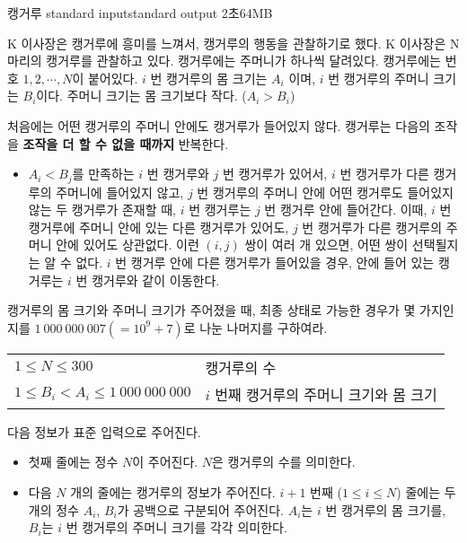 \begin{problem}{캥거루}
	{standard input}{standard output}
	{2초}{64MB}{}
	
	K 이사장은 캥거루에 흥미를 느껴서, 캥거루의 행동을 관찰하기로 했다. K 이사장은 N 마리의 캥거루를 관찰하고 있다. 캥거루에는 주머니가 하나씩 달려있다. 캥거루에는 번호 $1, 2, \cdots, N$이 붙어있다. $i$ 번 캥거루의 몸 크기는 $A_i$ 이며, $i$ 번 캥거루의 주머니 크기는 $B_i$이다. 주머니 크기는 몸 크기보다 작다. ($A_i > B_i$)
	
	처음에는 어떤 캥거루의 주머니 안에도 캥거루가 들어있지 않다. 캥거루는 다음의 조작을 \textbf{조작을 더 할 수 없을 때까지} 반복한다.
	
	\begin{itemize}
	\item[]  $A_i < B_j$를 만족하는 $i$ 번 캥거루와 $j$ 번 캥거루가 있어서, $i$ 번 캥거루가 다른 캥거루의 주머니에 들어있지 않고, $j$ 번 캥거루의 주머니 안에 어떤 캥거루도 들어있지 않는 두 캥거루가 존재할 때, $i$ 번 캥거루는 $j$ 번 캥거루 안에 들어간다. 이때, $i$ 번 캥거루에 주머니 안에 있는 다른 캥거루가 있어도, $j$ 번 캥거루가 다른 캥거루의 주머니 안에 있어도 상관없다. 이런 $(i, j)$ 쌍이 여러 개 있으면, 어떤 쌍이 선택될지는 알 수 없다. $i$ 번 캥거루 안에 다른 캥거루가 들어있을 경우, 안에 들어 있는 캥거루는 $i$ 번 캥거루와 같이 이동한다.
	\end{itemize}
	
	캥거루의 몸 크기와 주머니 크기가 주어졌을 때, 최종 상태로 가능한 경우가 몇 가지인지를 $1\ 000\ 000\ 007 (=10^9+7)$로 나눈 나머지를 구하여라.
	
	\Constraints
	
	
	\begin{tabular}{ll}
		$1 \le N \le 300$ & 캥거루의 수 \\
		$1 \le B_i < A_i \le 1\ 000\ 000\ 000$ & 	$i$ 번째 캥거루의 주머니 크기와 몸 크기 \\
	\end{tabular}
	
	
	\InputFile
	
	다음 정보가 표준 입력으로 주어진다.
	
	\begin{itemize}
		\item 첫째 줄에는 정수 $N$이 주어진다. $N$은 캥거루의 수를 의미한다.
		\item 다음 $N$ 개의 줄에는 캥거루의 정보가 주어진다. $i+1$ 번째 ($1 \le i \le N$) 줄에는 두 개의 정수 $A_i$, $B_i$가 공백으로 구분되어 주어진다. $A_i$는 $i$ 번 캥거루의 몸 크기를, $B_i$는 $i$ 번 캥거루의 주머니 크기를 각각 의미한다.
	\end{itemize}
	

\end{problem}
